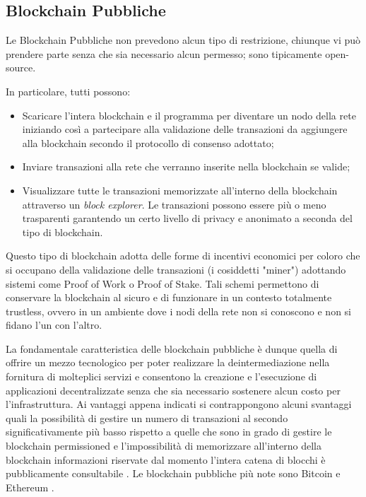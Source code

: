 \subsection{Blockchain Pubbliche}
Le Blockchain Pubbliche non prevedono alcun tipo di restrizione, chiunque vi può prendere parte senza che sia necessario alcun permesso; sono tipicamente open-source.

In particolare, tutti possono:

\begin{itemize}
  \item Scaricare l'intera blockchain e il programma per diventare un nodo della rete iniziando così a partecipare alla validazione delle transazioni da aggiungere alla blockchain secondo il protocollo di consenso adottato;
  \item Inviare transazioni alla rete che verranno inserite nella blockchain se valide;
  \item Visualizzare tutte le transazioni memorizzate all'interno della blockchain attraverso un \textit{block explorer}. Le transazioni possono essere più o meno trasparenti garantendo un certo livello di privacy e anonimato a seconda del tipo di blockchain.
\end{itemize}

Questo tipo di blockchain adotta delle forme di incentivi economici per coloro che si occupano della validazione delle transazioni (i cosiddetti "miner") adottando sistemi come Proof of Work o Proof of Stake. Tali schemi permettono di conservare la blockchain al sicuro e di funzionare in un contesto totalmente trustless, ovvero in un ambiente dove i nodi della rete non si conoscono e non si fidano l'un con l'altro. 

La fondamentale caratteristica delle blockchain pubbliche è dunque quella di offrire un mezzo tecnologico per poter realizzare la deintermediazione nella fornitura di molteplici servizi e consentono la creazione e l'esecuzione di applicazioni decentralizzate senza che sia necessario sostenere alcun costo per l'infrastruttura. Ai vantaggi appena indicati si contrappongono alcuni svantaggi quali la possibilità di gestire un numero di transazioni al secondo significativamente più basso rispetto a quelle che sono in grado di gestire le blockchain permissioned e l'impossibilità di memorizzare all'interno della blockchain informazioni riservate dal momento l'intera catena di blocchi è pubblicamente consultabile \cite{vukolic2015quest}. Le blockchain pubbliche più note sono Bitcoin \cite{nakamoto2008bitcoin} e Ethereum \cite{yafimava_2019}.

